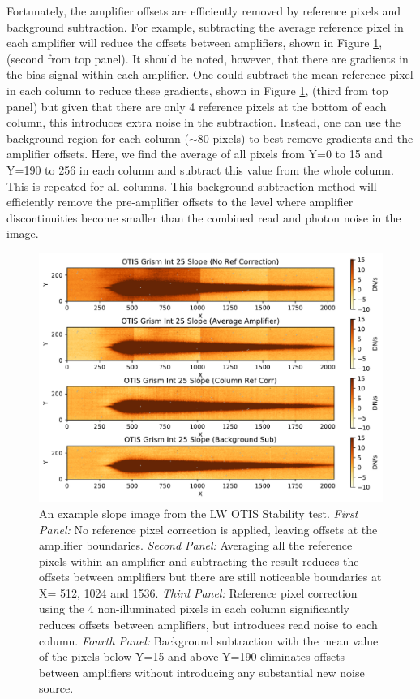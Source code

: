 \documentclass[]{aastex62}
\begin{document}
Fortunately, the amplifier offsets are efficiently removed by reference pixels and background subtraction.
For example, subtracting the average reference pixel in each amplifier will reduce the offsets between amplifiers, shown in Figure \ref{fig:ampOffsetsOtisGrismSlope}, (second from top panel).
It should be noted, however, that there are gradients in the bias signal within each amplifier.
One could subtract the mean reference pixel in each column to reduce these gradients, shown in Figure \ref{fig:ampOffsetsOtisGrismSlope}, (third from top panel) but given that there are only 4 reference pixels at the bottom of each column, this introduces extra noise in the subtraction.
Instead, one can use the background region for each column ($\sim$80 pixels) to best remove gradients and the amplifier offsets.
Here, we find the average of all pixels from Y=0 to 15 and Y=190 to 256 in each column and subtract this value from the whole column.
This is repeated for all columns.
This background subtraction method will efficiently remove the pre-amplifier offsets to the level where amplifier discontinuities become smaller than the combined read and photon noise in the image.

\begin{figure}[!hbtp]
\centering
\includegraphics[width=.79\columnwidth]{amplifier_offsets_in_otis_lw_grism.pdf}
\caption{An example slope image from the LW OTIS Stability test.
{\it First Panel:} No reference pixel correction is applied, leaving offsets at the amplifier boundaries.
{\it Second Panel:} Averaging all the reference pixels within an amplifier and subtracting the result reduces the offsets between amplifiers but there are still noticeable boundaries at X= 512, 1024 and 1536.
{\it Third Panel:} Reference pixel correction using the 4 non-illuminated pixels in each column significantly reduces offsets between amplifiers, but introduces read noise to each column.
{\it Fourth Panel:} Background subtraction with the mean value of the pixels below Y=15 and above Y=190 eliminates offsets between amplifiers without introducing any substantial new noise source.
}\label{fig:ampOffsetsOtisGrismSlope}
\end{figure}
\end{document}
